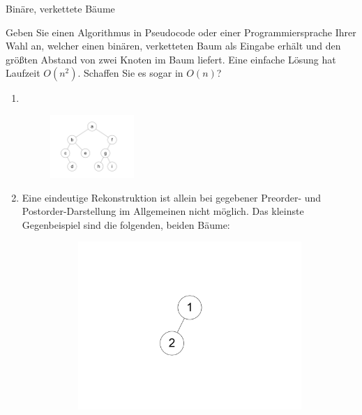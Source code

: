 \documentclass[11pt,a4paper]{article}
\begin{document}
\begin{aufgabe}{1}{Binäre, verkettete Bäume}
\begin{enumerate}
        Geben Sie einen Algorithmus in Pseudocode oder einer Programmiersprache Ihrer Wahl an, welcher einen binären, verketteten Baum als Eingabe erhält und den größten Abstand von zwei Knoten im Baum liefert.
        Eine einfache Lösung hat Laufzeit $O(n^2)$.
        Schaffen Sie es sogar in $O(n)$?
    \end{enumerate}
\end{aufgabe}
\begin{loesung}
    \begin{enumerate}
        \item \ \\
        \begin{figure}[h!]
            \centering
            \includegraphics[width=0.3\textwidth]{img/1a}
        \end{figure}
        \FloatBarrier
        \item Eine eindeutige Rekonstruktion ist allein bei gegebener Preorder- und Postorder-Darstellung im Allgemeinen nicht möglich.
        Das kleinste Gegenbeispiel sind die folgenden, beiden Bäume:
        \begin{figure}[h!]
            \centering
            \begin{subfigure}[b]{0.23\textwidth}
                \centering
                \includegraphics[width=\textwidth]{img/1b_1}

\end{subfigure}
\end{figure}
\end{enumerate}
\end{loesung}
\end{document}
